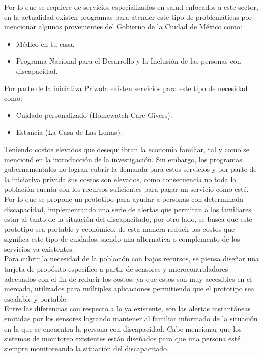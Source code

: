 Por lo que se requiere de servicios especializados en salud enfocados a este sector, en la actualidad existen programas para atender este tipo de problemáticas por mencionar algunos provenientes del Gobierno de la Ciudad de México como: 

\begin{itemize}
	\item Médico en tu casa.
	\item Programa Nacional para el Desarrollo y la Inclusión de las personas con discapacidad.
\end{itemize}

Por parte de la iniciativa Privada existen servicios para este tipo de necesidad como:

\begin{itemize}
	\item Cuidado personalizado (Homewatch Care Givers).
	\item Estancia (La Casa de Las Lunas).
\end{itemize}

Teniendo costos elevados que desequilibran la economía familiar, tal y como se mencionó en la introducción de la investigación. Sin embargo, los programas gubernamentales no logran cubrir la demanda para estos servicios y por parte de la iniciativa privada sus costos son elevados, como consecuencia no toda la población cuenta con los recursos suficientes para pagar un servicio como esté. \\
 
Por lo que se propone un prototipo para ayudar a personas con determinada discapacidad, implementando una serie de alertas que permitan a los familiares estar al tanto de la situación del discapacitado, por otro lado, se busca que este prototipo sea portable y económico, de esta manera reducir los costos que significa este tipo de cuidados, siendo una alternativa o complemento de los servicios ya existentes. \\

Para cubrir la necesidad de la población con bajos recursos, se piensa diseñar una tarjeta de propósito específico a partir de sensores y microcontroladores adecuados con el fin de reducir los costos, ya que estos son muy accesibles en el mercado, utilizados para múltiples aplicaciones permitiendo que el prototipo sea escalable y portable. \\

Entre las diferencias con respecto a lo ya existente, son las alertas instantáneas emitidas por los sensores logrando mantener al familiar informado de la situación en la que se encuentra la persona con discapacidad. Cabe mencionar que los sistemas de monitoreo existentes están diseñados para que una persona esté siempre monitoreando la situación del discapacitado.


 